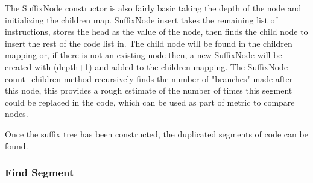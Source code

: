 \documentclass[9pt,nocopyrightspace]{sigplanconf}
\begin{document}
The SuffixNode constructor is also fairly basic taking the depth of the node and initializing the children map.
SuffixNode insert takes the remaining list of instructions, stores the head as the value of the node, then finds the child node to insert the rest of the code list in.
The child node will be found in the children mapping or, if there is not an existing node then, a new SuffixNode will be created with (depth+1) and added to the children mapping.
The SuffixNode count\_children method recursively finds the number of "branches" made after this node, this provides a rough estimate of the number of times this segment could be replaced in the code, which can be used as part of metric to compare nodes.

Once the suffix tree has been constructed, the duplicated segments of code can be found.

\subsubsection{Find Segment}
\end{document}
